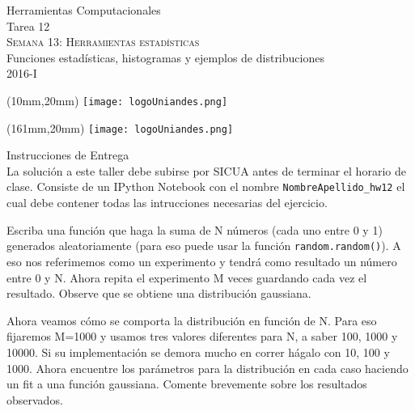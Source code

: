\documentclass[11pt,letterpaper]{exam}
\begin{document}
\begin{center}

\vspace{1.0cm}
{\Large Herramientas Computacionales \\
 Tarea 12} \\
\textsc{Semana 13: Herramientas estadísticas} \\
Funciones estadísticas, histogramas y ejemplos de distribuciones\\
2016-I\\
\end{center}

\begin{textblock*}{40mm}(10mm,20mm)
  \texttt{[image: logoUniandes.png]}
\end{textblock*}

\begin{textblock*}{40mm}(161mm,20mm)
  \texttt{[image: logoUniandes.png]}
\end{textblock*}

\vspace{0.5cm}

{\Large Instrucciones de Entrega}\\

\noindent
La solución a este taller debe subirse por SICUA antes de terminar 
el horario de clase.
\noindent
Consiste de un IPython Notebook con el nombre
\verb"NombreApellido_hw12"
el cual debe contener todas las intrucciones necesarias del ejercicio.

\begin{questions}


Escriba una función que haga la suma de N números (cada uno entre 0 y 1) generados aleatoriamente (para eso puede usar la función \verb+random.random()+). A eso nos referimemos como un experimento y tendrá como resultado un número entre 0 y N. Ahora repita el experimento M veces guardando cada vez el resultado. Observe que se obtiene una distribución gaussiana. 


Ahora veamos cómo se comporta la distribución en función de N. Para eso fijaremos M=1000 y usamos tres valores diferentes para N, a saber 100, 1000 y 10000. Si su implementación se demora mucho en correr hágalo con 10, 100 y 1000. Ahora encuentre los parámetros para la distribución en cada caso haciendo un fit a una función gaussiana. Comente brevemente sobre los resultados observados.

\end{questions}
\end{document}
